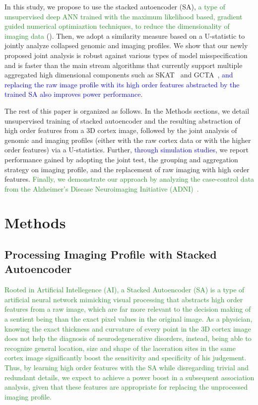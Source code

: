 \documentclass[11pt]{article}
\newcommand{\xadd}[1]{\textcolor{blue}{#1}}
\newcommand{\xacc}[1]{\textcolor{ForestGreen}{#1}}
\begin{document}
In this study, we propose to use the stacked autoencoder (SA), \xacc{a type of unsupervised deep ANN trained with the maximum likelihood based, gradient guided numerical optimiaztion techniques, to reduce the dimensionality of imaging data} (\cite{DL:SDA1, DL:Intro2}). Then, we adopt a similarity measure based on a U-statistic \citep{UST1, UST2} to jointly analyze collapsed genomic and imaging profiles. We show that our newly proposed joint analysis is robust against various types of model misspecification and is faster than the main stream algorithms that currently support multiple aggregated high dimensional components such as SKAT~\citep{SKAT} and GCTA~\citep{GCTA}, \xadd{and replacing the raw image profile with its high order features abstracted by the trained SA also improves power performance}.

The rest of this paper is organized as follows. In the Methods sections, we detail unsupervised training of stacked autoencoder and the resulting abstraction of high order features from a 3D cortex image, followed by the joint analysis of genomic and imaging profiles (either with the raw cortex data or with the higher order features) via a U-statistics. Further, \xadd{through simulation studies}, we report performance gained by adopting the joint test, the grouping and aggregation strategy on imaging profile, and the replacement of raw imaging with high order features.  \xacc{Finally, we demonstrate our approach by analyzing the case-control data from the Alzheimer’s Disease Neuroimaging Initiative (ADNI)~\citep{ADNI05, ADNI10}.}

\section*{Methods}

\subsection*{Processing Imaging Profile with Stacked Autoencoder}
\xacc{Rooted in Artificial Intellegence (AI), a Stacked Autoencoder (SA) is a type of artificial neural network mimicking visual processing that abstracts high order features from a raw image, which are far more relevant to the decision making of a sentient being than the exact pixel values in the original image. As a physician, knowing the exact thickness and curvature of every point in the 3D cortex image does not help the diagnosis of neurodegenerative disorders, instead, being able to recognize general location, size and shape of the laceration sites in the same cortex image significantly boost the sensitivity and specificity of his judgement. Thus, by learning high order features with the SA while disregarding trivial and redundant details, we expect to achieve a power boost in a subsequent association analysis, given that these features are appropriate for replacing the unprocessed imaging profile.}
\end{document}
